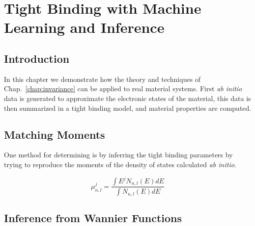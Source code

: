 \chapter{Tight Binding with Machine Learning and Inference}
\section{Introduction}
In this chapter we demonstrate how the theory and techniques of 
Chap.~\ref{chap:invariance} can be applied to real material systems.
First {\it ab initio} data is generated to approximate the electronic 
states of the material, this data is then summarized in a tight binding
model, and material properties are computed.


\section{Matching Moments}
One method for determining is by inferring the tight binding parameters
by trying to reproduce the moments of the density of states calculated 
{\it ab initio}.

\begin{equation}
\mu^{j}_{n,l} = \frac{\int E^{j}N_{n,l}(E)dE}{\int N_{n,l}(E)dE}
\end{equation}

\section{Inference from Wannier Functions}

